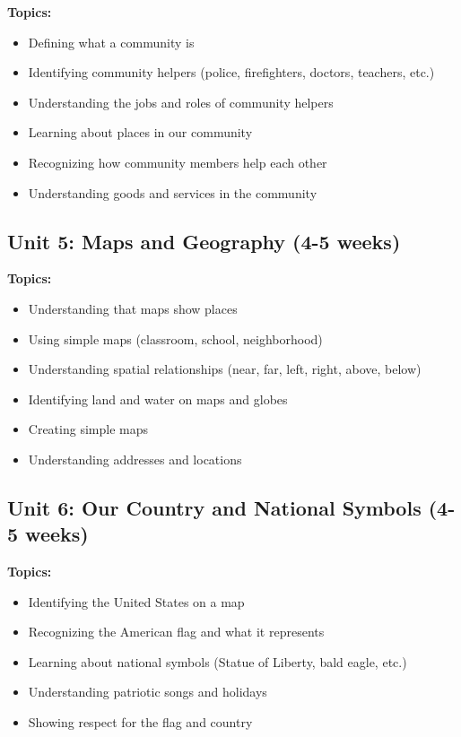 \documentclass[11pt,letterpaper]{report}
\begin{document}
\textbf{Topics:}
\begin{itemize}
    \item Defining what a community is
    \item Identifying community helpers (police, firefighters, doctors, teachers, etc.)
    \item Understanding the jobs and roles of community helpers
    \item Learning about places in our community
    \item Recognizing how community members help each other
    \item Understanding goods and services in the community
\end{itemize}

\subsection{Unit 5: Maps and Geography (4-5 weeks)}

\textbf{Topics:}
\begin{itemize}
    \item Understanding that maps show places
    \item Using simple maps (classroom, school, neighborhood)
    \item Understanding spatial relationships (near, far, left, right, above, below)
    \item Identifying land and water on maps and globes
    \item Creating simple maps
    \item Understanding addresses and locations
\end{itemize}

\subsection{Unit 6: Our Country and National Symbols (4-5 weeks)}

\textbf{Topics:}
\begin{itemize}
    \item Identifying the United States on a map
    \item Recognizing the American flag and what it represents
    \item Learning about national symbols (Statue of Liberty, bald eagle, etc.)
    \item Understanding patriotic songs and holidays
    \item Showing respect for the flag and country
\end{itemize}
\end{document}
